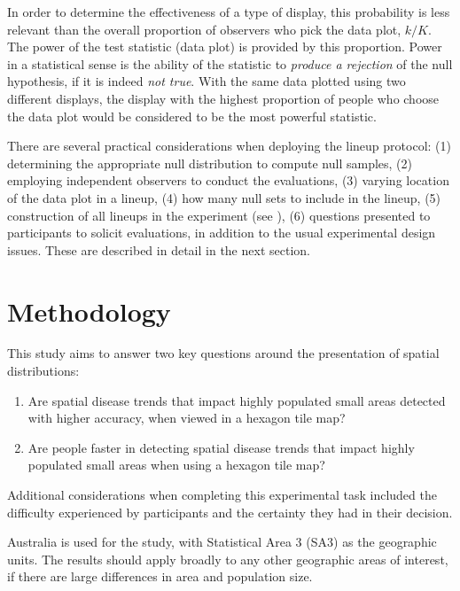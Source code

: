 \documentclass[
doublespace,
  times]{anzsauth}
\providecommand{\tightlist}{%
  \setlength{\itemsep}{0pt}\setlength{\parskip}{0pt}}
\begin{document}
In order to determine the effectiveness of a type of display, this
probability is less relevant than the overall proportion of observers
who pick the data plot, \(k/K\). The power of the test statistic (data
plot) is provided by this proportion. Power in a statistical sense is
the ability of the statistic to \emph{produce a rejection} of the null
hypothesis, if it is indeed \emph{not true}. With the same data plotted
using two different displays, the display with the highest proportion of
people who choose the data plot would be considered to be the most
powerful statistic.

There are several practical considerations when deploying the lineup
protocol: (1) determining the appropriate null distribution to compute
null samples, (2) employing independent observers to conduct the
evaluations, (3) varying location of the data plot in a lineup, (4) how
many null sets to include in the lineup, (5) construction of all lineups
in the experiment (see \citet{VRCH}), (6) questions presented to
participants to solicit evaluations, in addition to the usual
experimental design issues. These are described in detail in the next
section.

\section{Methodology}\label{sec-methodology}

This study aims to answer two key questions around the presentation of
spatial distributions:

\begin{enumerate}
\def\labelenumi{\arabic{enumi}.}
\tightlist
\item
  Are spatial disease trends that impact highly populated small areas
  detected with higher accuracy, when viewed in a hexagon tile map?
\item
  Are people faster in detecting spatial disease trends that impact
  highly populated small areas when using a hexagon tile map?
\end{enumerate}

Additional considerations when completing this experimental task
included the difficulty experienced by participants and the certainty
they had in their decision.

Australia is used for the study, with Statistical Area 3 (SA3)
\citep{abs2016} as the geographic units. The results should apply
broadly to any other geographic areas of interest, if there are large
differences in area and population size.
\end{document}
